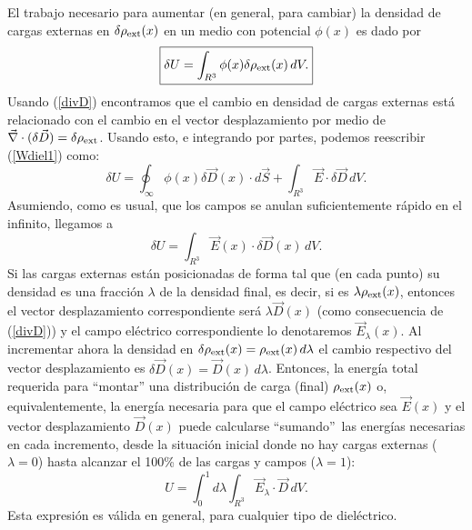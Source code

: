 El trabajo necesario para aumentar (en general, para cambiar) la densidad de
cargas externas en $\delta\rho_{\rm ext}(x)$ en un medio con potencial
$\phi(x)$ es dado por
\begin{equation}\label{Wdiel1}
 \boxed{\delta U=\int_{R^3}\phi(x)\delta\rho_{\rm ext}(x)\,dV.} 
\end{equation}
Usando (\ref{divD}) encontramos que el cambio en densidad de cargas externas
está relacionado con el cambio en el vector desplazamiento por medio de
$\vec\nabla\cdot(\delta\vec{D})=\delta\rho_{\rm ext}$. Usando esto, e integrando
por partes, podemos reescribir (\ref{Wdiel1}) como:
\begin{equation}
 \delta U=\oint_{\infty}\phi (x)\delta\vec{D}(x)\cdot
d\vec{S}+\int_{R^3}\vec{E}\cdot\delta\vec{D}\,dV.
\end{equation}
Asumiendo, como es usual, que los campos se anulan suficientemente rápido en
el infinito, llegamos a
\begin{equation}
 \boxed{\delta U=\int_{R^3}\vec{E}(x)\cdot\delta\vec{D}(x)\,dV.} \label{dUE}
\end{equation}
Si las cargas externas están posicionadas de forma tal que (en cada punto) su
densidad es una fracción $\lambda$ de la densidad final, es decir, si es
$\lambda\rho_{\rm ext}(x)$, entonces el vector desplazamiento correspondiente
será $\lambda\vec{D}(x)$ (como consecuencia de (\ref{divD})) y el campo
eléctrico correspondiente lo denotaremos $\vec{E}_\lambda(x)$. Al incrementar
ahora la densidad en $\delta\rho_{\rm ext}(x)=\rho_{\rm ext}(x)\,d\lambda$ el cambio respectivo del vector desplazamiento es $\delta\vec{D}(x)=\vec{D}(x)\,d\lambda$. Entonces, la energía total requerida para ``montar'' una distribución de carga (final)
$\rho_{\rm ext}(x)$ o, equivalentemente, la energía necesaria para que el campo
eléctrico sea $\vec{E}(x)$ y el vector desplazamiento $\vec{D}(x)$ puede
calcularse ``sumando''\, las energías necesarias en cada incremento, desde la
situación inicial donde no hay cargas externas ($\lambda=0$) hasta alcanzar el
100\% de las cargas y campos ($\lambda=1$):
\begin{equation}
U=\int_0^1 d\lambda\int_{R^3}\vec{E}_\lambda\cdot \vec{D}\,dV .
\end{equation}
Esta expresión es válida en general, para cualquier tipo de dieléctrico.

